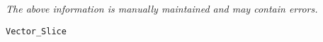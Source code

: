 \label{pkg:vector\_slice}

{\tiny \it The above information is manually maintained and may contain errors.}
\begin{verbatim}
Vector_Slice
\end{verbatim}
